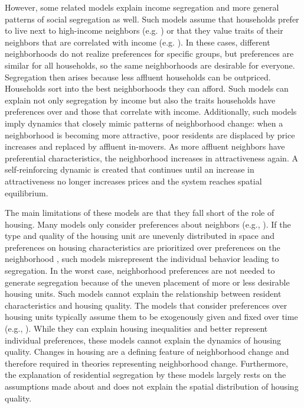 However, some related models explain income segregation and more general patterns of social segregation as well. Such models assume that households prefer to live next to high-income neighbors (e.g. \cite{tieboutPureTheoryLocal1956, guerrieriEndogenousGentrificationHousing2013}) or that they value traits of their neighbors that are correlated with income (e.g. \cite{bayerEquilibriumModelSorting2004, fossettEthnicPreferencesSocial2006, benardWealthStatusBasedModel2007, yavasDissectingIncomeSegregation2019}). In these cases, different neighborhoods do not realize preferences for specific groups, but preferences are similar for all households, so the same neighborhoods are desirable for everyone. Segregation then arises because less affluent households can be outpriced. Households sort into the best neighborhoods they can afford. Such models can explain not only segregation by income but also the traits households have preferences over and those that correlate with income. Additionally, such models imply dynamics that closely mimic patterns of neighborhood change: when a neighborhood is becoming more attractive, poor residents are displaced by price increases and replaced by affluent in-movers. As more affluent neighbors have preferential characteristics, the neighborhood increases in attractiveness again. A self-reinforcing dynamic is created that continues until an increase in attractiveness no longer increases prices and the system reaches spatial equilibrium.

The main limitations of these models are that they fall short of the role of housing. Many models only consider preferences about neighbors (e.g., \cite{guerrieriEndogenousGentrificationHousing2013, yavasDissectingIncomeSegregation2019}). If the type and quality of the housing unit are unevenly distributed in space \citep{loufPatternsResidentialSegregation2016, oecdDividedCitiesUnderstanding2018, owensBuildingInequalityHousing2019, beaubrun-diantImpactPublicHousing2022} and preferences on housing characteristics are prioritized over preferences on the neighborhood \citep{chauCriticalReviewLiterature2003, bayerEquilibriumModelSorting2004, mummoloWhyPartisansNot2017, delucaNotJustLateral2020}, such models misrepresent the individual behavior leading to segregation. In the worst case, neighborhood preferences are not needed to generate segregation because of the uneven placement of more or less desirable housing units. Such models cannot explain the relationship between resident characteristics and housing quality. The models that consider preferences over housing units typically assume them to be exogenously given and fixed over time (e.g., \cite{bayerEquilibriumModelSorting2004, fossettEthnicPreferencesSocial2006, benardWealthStatusBasedModel2007}). While they can explain housing inequalities and better represent individual preferences, these models cannot explain the dynamics of housing quality. Changes in housing are a defining feature of neighborhood change \citep{zukinGentrificationCultureCapital1987, redfernWhatMakesGentrification2003} and therefore required in theories representing neighborhood change. Furthermore, the explanation of residential segregation by these models largely rests on the assumptions made about and does not explain the spatial distribution of housing quality.


